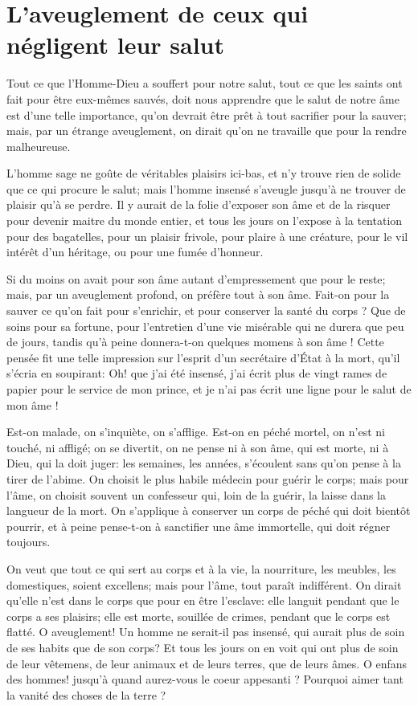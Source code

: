 \documentclass[instructions.tex]{subfiles}
\begin{document}
 
\chapter{L'aveuglement de ceux qui négligent leur salut}
 

\primo Tout ce que l'Homme-Dieu a souffert pour notre salut, tout ce que les saints ont fait pour être eux-mêmes sauvés, doit nous apprendre que le salut de notre âme est d'une telle importance, qu'on devrait être prêt à tout sacrifier pour la sauver; mais, par un étrange aveuglement, on dirait qu'on ne travaille que pour la rendre malheureuse. 

L'homme sage ne goûte de véritables plaisirs ici-bas, et n'y trouve rien de solide que ce qui procure le salut; mais l'homme insensé s'aveugle jusqu'à ne trouver de plaisir qu'à se perdre. Il y aurait de la folie d'exposer son âme et de la risquer pour devenir maitre du monde entier, et tous les jours on l'expose à la tentation pour des bagatelles, pour un plaisir frivole, pour plaire à une créature, pour le vil intérêt d'un héritage, ou pour une fumée d'honneur. 

\secundo Si du moins on avait pour son âme autant d'empressement que pour le reste; mais, par un aveuglement profond, on préfère tout à son âme. Fait-on pour la sauver ce qu'on fait pour s'enrichir, et pour conserver la santé du corps ? Que de soins pour sa fortune, pour l'entretien d'une vie misérable qui ne durera que peu de jours, tandis qu'à peine donnera-t-on quelques momens à son âme ! Cette pensée fit une telle impression sur l'esprit d'un secrétaire d'État à la mort, qu'il s'écria en soupirant: \og Oh! que j'ai été insensé, j'ai écrit plus de vingt rames de papier pour le service de mon prince, et je n'ai pas écrit une ligne pour le salut de mon âme ! \fg 

Est-on malade, on s'inquiète, on s'afflige. Est-on en péché mortel, on n'est ni touché, ni affligé; on se divertit, on ne pense ni à son âme, qui est morte, ni à Dieu, qui la doit juger: les semaines, les années, s'écoulent sans qu'on pense à la tirer de l'abime. On choisit le plus habile médecin pour guérir le corps; mais pour l'âme, on choisit souvent un confesseur qui, loin de la guérir, la laisse dans la langueur de la mort. On s'applique à conserver un corps de péché qui doit bientôt pourrir, et à peine pense-t-on à sanctifier une âme immortelle, qui doit régner toujours. 

On veut que tout ce qui sert au corps et à la vie, la nourriture, les meubles, les domestiques, soient excellens; mais pour l'âme, tout paraît indifférent. On dirait qu'elle n'est dans le corps que pour en être l'esclave: elle languit pendant que le corps a ses plaisirs; elle est morte, souillée de crimes, pendant que le corps est flatté. O aveuglement! Un homme ne serait-il pas insensé, qui aurait plus de soin de ses habits que de son corps? Et tous les jours on en voit qui ont plus de soin de leur vêtemens, de leur animaux et de leurs terres, que de leurs âmes. O enfans des hommes! jusqu'à quand aurez-vous le coeur appesanti ? Pourquoi aimer tant la vanité des choses de la terre ?
\end{document}
